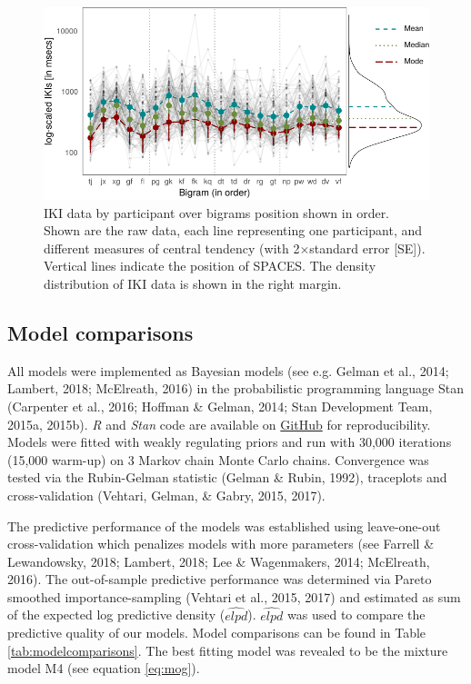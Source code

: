 \documentclass[english,jou,floatsintext]{apa7}
\begin{document}
\begin{figure}[!ht]

{\centering \includegraphics{frontline_files/figure-latex/descriptives-1} 

}

\caption{IKI data by participant over bigrams position shown in order. Shown are the raw data, each line representing one participant, and different measures of central tendency (with 2$\times$standard error [SE]). Vertical lines indicate the position of SPACES. The density distribution of IKI data is shown in the right margin.}\label{fig:descriptives}
\end{figure}

\hypertarget{model-comparisons}{%
\subsection{Model comparisons}\label{model-comparisons}}

All models were implemented as Bayesian models (see e.g. Gelman et al., 2014; Lambert, 2018; McElreath, 2016) in the probabilistic programming language Stan (Carpenter et al., 2016; Hoffman \& Gelman, 2014; Stan Development Team, 2015a, 2015b). \textit{R} and \textit{Stan} code are available on \href{https://github.com/jensroes/Frontline}{GitHub} for reproducibility. Models were fitted with weakly regulating priors and run with 30,000 iterations (15,000 warm-up) on 3 Markov chain Monte Carlo chains. Convergence was tested via the Rubin-Gelman statistic (Gelman \& Rubin, 1992), traceplots and cross-validation (Vehtari, Gelman, \& Gabry, 2015, 2017).

The predictive performance of the models was established using leave-one-out cross-validation which penalizes models with more parameters (see Farrell \& Lewandowsky, 2018; Lambert, 2018; Lee \& Wagenmakers, 2014; McElreath, 2016). The out-of-sample predictive performance was determined via Pareto smoothed importance-sampling (Vehtari et al., 2015, 2017) and estimated as sum of the expected log predictive density (\(\widehat{elpd}\)). \(\widehat{elpd}\) was used to compare the predictive quality of our models. Model comparisons can be found in Table \ref{tab:modelcomparisons}. The best fitting model was revealed to be the mixture model M4 (see equation \ref{eq:mog}).
\end{document}
